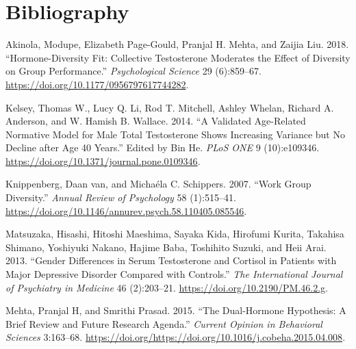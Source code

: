 \documentclass[]{article}
\begin{document}
\hypertarget{bibliography}{%
\section*{Bibliography}\label{bibliography}}

\hypertarget{refs}{}
\leavevmode\hypertarget{ref-Akinola2018}{}%
Akinola, Modupe, Elizabeth Page-Gould, Pranjal H. Mehta, and Zaijia Liu.
2018. ``Hormone-Diversity Fit: Collective Testosterone Moderates the
Effect of Diversity on Group Performance.'' \emph{Psychological Science}
29 (6):859--67. \url{https://doi.org/10.1177/0956797617744282}.

\leavevmode\hypertarget{ref-Kelsey2014}{}%
Kelsey, Thomas W., Lucy Q. Li, Rod T. Mitchell, Ashley Whelan, Richard
A. Anderson, and W. Hamish B. Wallace. 2014. ``A Validated Age-Related
Normative Model for Male Total Testosterone Shows Increasing Variance
but No Decline after Age 40 Years.'' Edited by Bin He. \emph{PLoS ONE} 9
(10):e109346. \url{https://doi.org/10.1371/journal.pone.0109346}.

\leavevmode\hypertarget{ref-vanK}{}%
Knippenberg, Daan van, and Michaéla C. Schippers. 2007. ``Work Group
Diversity.'' \emph{Annual Review of Psychology} 58 (1):515--41.
\url{https://doi.org/10.1146/annurev.psych.58.110405.085546}.

\leavevmode\hypertarget{ref-matsu}{}%
Matsuzaka, Hisashi, Hitoshi Maeshima, Sayaka Kida, Hirofumi Kurita,
Takahisa Shimano, Yoshiyuki Nakano, Hajime Baba, Toshihito Suzuki, and
Heii Arai. 2013. ``Gender Differences in Serum Testosterone and Cortisol
in Patients with Major Depressive Disorder Compared with Controls.''
\emph{The International Journal of Psychiatry in Medicine} 46
(2):203--21. \url{https://doi.org/10.2190/PM.46.2.g}.

\leavevmode\hypertarget{ref-MEHTA2015163}{}%
Mehta, Pranjal H, and Smrithi Prasad. 2015. ``The Dual-Hormone
Hypothesis: A Brief Review and Future Research Agenda.'' \emph{Current
Opinion in Behavioral Sciences} 3:163--68.
\url{https://doi.org/https://doi.org/10.1016/j.cobeha.2015.04.008}.
\end{document}
